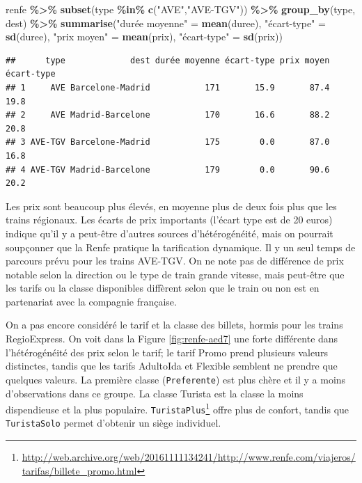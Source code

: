 \documentclass[
  11pt,
  letterpaper,
]{article}
\newenvironment{Shaded}{\begin{snugshade}}{\end{snugshade}}
\newcommand{\KeywordTok}[1]{\textcolor[rgb]{0.13,0.29,0.53}{\textbf{#1}}}
\newcommand{\NormalTok}[1]{#1}
\newcommand{\OperatorTok}[1]{\textcolor[rgb]{0.81,0.36,0.00}{\textbf{#1}}}
\newcommand{\StringTok}[1]{\textcolor[rgb]{0.31,0.60,0.02}{#1}}
\renewcommand{\href}[2]{#2\footnote{\url{#1}}}
\theoremstyle{definition}
\theoremstyle{definition}
\theoremstyle{definition}
\theoremstyle{remark}
\begin{document}
\begin{Shaded}
\begin{Highlighting}[]
\NormalTok{renfe }\OperatorTok{\%\textgreater{}\%}\StringTok{ }
\StringTok{  }\KeywordTok{subset}\NormalTok{(type }\OperatorTok{\%in\%}\StringTok{ }\KeywordTok{c}\NormalTok{(}\StringTok{"AVE"}\NormalTok{,}\StringTok{"AVE{-}TGV"}\NormalTok{)) }\OperatorTok{\%\textgreater{}\%}\StringTok{ }
\StringTok{  }\KeywordTok{group\_by}\NormalTok{(type, dest) }\OperatorTok{\%\textgreater{}\%}\StringTok{ }
\StringTok{  }\KeywordTok{summarise}\NormalTok{(}\StringTok{"durée moyenne"}\NormalTok{ =}\StringTok{ }\KeywordTok{mean}\NormalTok{(duree), }
            \StringTok{"écart{-}type"}\NormalTok{ =}\StringTok{ }\KeywordTok{sd}\NormalTok{(duree),}
            \StringTok{"prix moyen"}\NormalTok{ =}\StringTok{ }\KeywordTok{mean}\NormalTok{(prix),}
            \StringTok{"écart{-}type"}\NormalTok{ =}\StringTok{ }\KeywordTok{sd}\NormalTok{(prix))}
\end{Highlighting}
\end{Shaded}

\begin{verbatim}
##      type             dest durée moyenne écart-type prix moyen écart-type
## 1     AVE Barcelone-Madrid           171       15.9       87.4       19.8
## 2     AVE Madrid-Barcelone           170       16.6       88.2       20.8
## 3 AVE-TGV Barcelone-Madrid           175        0.0       87.0       16.8
## 4 AVE-TGV Madrid-Barcelone           179        0.0       90.6       20.2
\end{verbatim}

Les prix sont beaucoup plus élevés, en moyenne plus de deux fois plus que les trains régionaux. Les écarts de prix importants (l'écart type est de 20 euros) indique qu'il y a peut-être d'autres sources d'hétérogénéité, mais on pourrait soupçonner que la Renfe pratique la tarification dynamique. Il y un seul temps de parcours prévu pour les trains AVE-TGV. On ne note pas de différence de prix notable selon la direction ou le type de train grande vitesse, mais peut-être que les tarifs ou la classe disponibles diffèrent selon que le train ou non est en partenariat avec la compagnie française.

On a pas encore considéré le tarif et la classe des billets, hormis pour les trains RegioExpress. On voit dans la Figure \ref{fig:renfe-aed7} une forte différente dans l'hétérogénéité des prix selon le tarif; le tarif Promo prend plusieurs valeurs distinctes, tandis que les tarifs AdultoIda et Flexible semblent ne prendre que quelques valeurs. La première classe (\texttt{Preferente}) est plus chère et il y a moins d'observations dans ce groupe. La classe Turista est la classe la moins dispendieuse et la plus populaire. \href{http://web.archive.org/web/20161111134241/http://www.renfe.com/viajeros/tarifas/billete_promo.html}{\texttt{TuristaPlus}} offre plus de confort, tandis que \texttt{TuristaSolo} permet d'obtenir un siège individuel.
\end{document}
